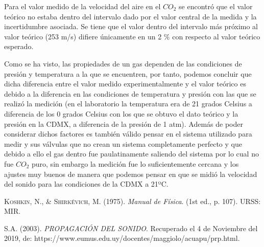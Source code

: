 \documentclass[10pt,a4paper]{article}
\begin{document}
Para el valor medido de la velocidad del aire en el $CO_2$ se encontró que el valor teórico no estaba dentro del intervalo dado por el valor central de la medida y la incertidumbre asociada. Se tiene que el valor dentro del intervalo más próximo al valor teórico (253 m/s) difiere únicamente en un 2 $\%$ con respecto al valor teórico esperado. 

Como se ha visto, las propiedades de un gas dependen de las condiciones de presión y temperatura a la que se encuentren, por tanto, podemos concluir que dicha diferencia entre el valor medido experimentalmente y el valor teórico es debido a la diferencia en las condiciones de temperatura y presión con las que se realizó la medición (en el laboratorio la temperatura era de 21 grados Celsius a diferencia de los 0 grados Celsius con los que se obtuvo el dato teórico y la presión en la CDMX, a diferencia de la presión de 1 atm). Además de poder considerar dichos factores es también válido pensar en el sistema utilizado para medir y sus válvulas que no crean un sistema completamente perfecto y que debido a ello el gas dentro fue paulatinamente saliendo del sistema por lo cual no fue $CO_2$ puro, sin embargo la medición fue lo suficientemente cercana y los ajustes muy buenos de manera que podemos pensar en que se midió la velocidad del sonido para las condiciones de la CDMX a 21ºC. 




\begin{thebibliography}{a}
 \textsc{Koshkin, N., \& Shirkévich, M.} (1975). \textit{Manual de Física}. (1st ed., p. 107). URSS: MIR.

 \textsc{S.A.} (2003). \textit{PROPAGACIÓN DEL SONIDO}. Recuperado el 4 de Noviembre del 2019, de:  https://www.eumus.edu.uy/docentes/maggiolo/acuapu/prp.html.

\end{thebibliography}
\end{document}
